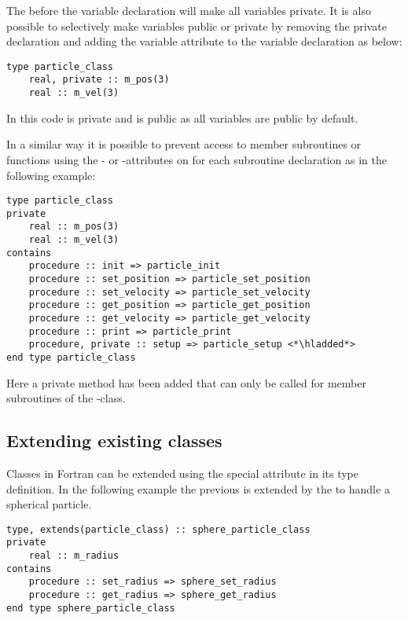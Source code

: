 The  before the variable declaration will make all variables private. It is also possible to selectively make variables public or private by removing the private declaration and adding the variable attribute  to the variable declaration as below:

\begin{lstlisting}
type particle_class
    real, private :: m_pos(3)
    real :: m_vel(3)
\end{lstlisting}

In this code  is private and  is public as all variables are public by default.

In a similar way it is possible to prevent access to member subroutines or functions using the - or -attributes on for each subroutine declaration as in the following example:

\begin{lstlisting}
type particle_class
private
    real :: m_pos(3)
    real :: m_vel(3)
contains
    procedure :: init => particle_init
    procedure :: set_position => particle_set_position
    procedure :: set_velocity => particle_set_velocity 
    procedure :: get_position => particle_get_position
    procedure :: get_velocity => particle_get_velocity
    procedure :: print => particle_print
    procedure, private :: setup => particle_setup <*\hladded*>
end type particle_class
\end{lstlisting}

Here a private method  has been added that can only be called for member subroutines of the -class.

\subsection{Extending existing classes}

Classes in Fortran can be extended using the special attribute  in its type definition. In the following example the previous  is extended by the  to handle a spherical particle. 

\begin{lstlisting}
type, extends(particle_class) :: sphere_particle_class
private
    real :: m_radius
contains
    procedure :: set_radius => sphere_set_radius
    procedure :: get_radius => sphere_get_radius
end type sphere_particle_class
\end{lstlisting}

